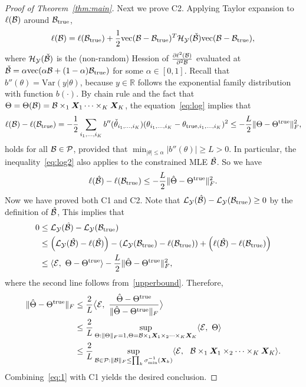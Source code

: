 \documentclass[11pt]{article}
\theoremstyle{plain}
\theoremstyle{definition}
\begin{document}
\begin{proof}[Proof of Theorem~\ref{thm:main}]
Next we prove C2. Applying Taylor expansion to $\ell(\mathcal{B})$ around $\mathcal{B}_{\text{true}}$, 
\begin{equation}\label{eq:log}
\ell(\mathcal{B})=\ell(\mathcal{B}_{\text{true}})+{1\over 2}\text{vec}(\mathcal{B}-\mathcal{B}_{\text{true}})^T \mathcal{H}_{\mathcal{Y}}(\check {\mathcal{B}})\text{vec}(\mathcal{B}-\mathcal{B}_{\text{true}}),
\end{equation}
where $\mathcal{H}_{\mathcal{Y}}(\check {\mathcal{B}})$ is the (non-random) Hession of ${\partial \ell^2 (\mathcal{B})\over\partial^2 \mathcal{B}}$ evaluated at $\check {\mathcal{B}} =\alpha \text{vec}(\alpha \mathcal{B}+(1-\alpha)\mathcal{B}_{\text{true}})$ for some $\alpha\in[0,1]$. Recall that $b''(\theta)=\text{Var}(y|\theta)$, because $y\in\mathbb{R}$ follows the exponential family distribution with function $b(\cdot)$. By chain rule and the fact that $\Theta=\Theta(\mathcal{B})=\mathcal{B}\times_1\bm X_1\cdots\times_K\bm X_K$, the equation~\eqref{eq:log} implies that
\begin{equation}\label{eq:log2}
\ell(\mathcal{B})-\ell(\mathcal{B}_{\text{true}})=-{1\over 2}\sum_{i_1,\ldots,i_K}b''(\check \theta_{i_1,\ldots,i_K}) (\theta_{i_1,\ldots,i_K}-\theta_{\text{true},i_1,\ldots,i_K})^2 \leq -{L \over 2}\lVert\Theta-\Theta^{\text{true}}\rVert_F^2,
\end{equation}
holds for all $\mathcal{B}\in\mathcal{P}$, provided that $\min_{|\theta|\leq \alpha}|b''(\theta)|\geq L>0$. In particular, the inequality~\eqref{eq:log2} also applies to the constrained MLE $\hat {\mathcal{B}}$. So we have
\begin{equation}\label{upperbound}
\ell(\hat {\mathcal{B}})-\ell(\mathcal{B}_{\text{true}})\leq -{L \over 2}\lVert\hat \Theta-\Theta^{\text{true}}\rVert_F^2.
\end{equation}
Now we have proved both C1 and C2. Note that $\mathcal{L}_{\mathcal{Y}}(\hat {\mathcal{B}})- \mathcal{L}_{\mathcal{Y}}(\mathcal{B}_{\text{true}})\geq 0$ by the definition of $\hat {\mathcal{B}}$, This implies that
\begin{align}
0&\leq \mathcal{L}_{\mathcal{Y}}(\hat {\mathcal{B}})- \mathcal{L}_{\mathcal{Y}}(\mathcal{B}_{\text{true}}) \\
&\leq \left(\mathcal{L}_{\mathcal{Y}}(\hat {\mathcal{B}})-\ell(\hat {\mathcal{B}})\right)-\left( \mathcal{L}_{\mathcal{Y}}(\mathcal{B}_{\text{true}})-\ell(\mathcal{B}_{\text{true}})\right)+\left(\ell(\hat {\mathcal{B}})-\ell(\mathcal{B}_{\text{true}})\right)\\
&\leq \langle\mathcal{E},\ \Theta-\Theta^{\text{true}}    \rangle -{L\over 2}\lVert\hat \Theta-\Theta^{\text{true}}\rVert_F^2,
\end{align}
where the second line follows from~\eqref{upperbound}. Therefore,
\begin{align}\label{eq:1}
\lVert\hat \Theta-\Theta^{\text{true}}\rVert_F&\leq {2\over L}\big\langle \mathcal{E},\ {\hat \Theta -\Theta^{\text{true}} \over \lVert\hat \Theta-\Theta^{\text{true}}\rVert_F} \big\rangle\notag \\
&\leq {2\over L}\sup_{\Theta: \lVert\Theta\rVert_F=1, \Theta=\mathcal{B}\times_1\bm X_1\times_2\cdots\times_K \bm X_K}\langle \mathcal{E},\ \Theta \rangle\notag \\
&\leq {2\over L}\sup_{\mathcal{B}\in\mathcal{P}: \lVert\mathcal{B}\rVert_F\leq \prod_k \sigma^{-1}_{\min}(\bm X_k)} \langle \mathcal{E},\ \ \mathcal{B}\times_1\bm X_1\times_2\cdots\times_K\bm X_K\rangle.
\end{align}
Combining~\eqref{eq:1} with C1 yields the desired conclusion. 


\end{proof}
\end{document}
